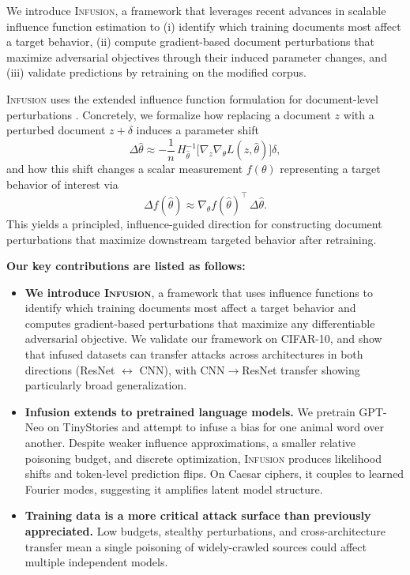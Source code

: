 \documentclass{article}
\theoremstyle{plain}
\theoremstyle{definition}
\theoremstyle{remark}
\begin{document}
We introduce \textsc{Infusion}, a framework that leverages recent advances in scalable influence function estimation \citep{bae2022if, grosse2023studying} to (i) identify which training documents most affect a target behavior, (ii) compute gradient-based document perturbations that maximize adversarial objectives through their induced parameter changes, and (iii) validate predictions by retraining on the modified corpus.


\textsc{Infusion} uses the extended influence function formulation for document-level perturbations \citep{koh2017understanding}. Concretely, we formalize how replacing a document $z$ with a perturbed document $z+\delta$ induces a parameter shift
\begin{equation}
\Delta \hat{\theta}
\approx
-\frac{1}{n}\, H_{\hat{\theta}}^{-1}
\Big[\nabla_{z}\nabla_{\theta} L\!\left(z,\hat{\theta}\right)\Big]\delta,
\end{equation}
and how this shift changes a scalar measurement $f(\theta)$ representing a target behavior of interest via
\begin{equation}
\Delta f(\hat{\theta})
\approx
\nabla_{\theta} f(\hat{\theta})^{\top}\,\Delta \hat{\theta}.
\end{equation}
This yields a principled, influence-guided direction for constructing document perturbations that maximize downstream targeted behavior after retraining.


\textbf{Our key contributions are listed as follows:}

\begin{itemize}
    \item \textbf{We introduce \textsc{Infusion}}, a framework that uses influence functions to identify which training documents most affect a target behavior and computes gradient-based perturbations that maximize any differentiable adversarial objective. We validate our framework on CIFAR-10, and show that infused datasets can transfer attacks across architectures in both directions (ResNet $\leftrightarrow$ CNN), with CNN$\to$ResNet transfer showing particularly broad generalization.
    \item \textbf{Infusion extends to pretrained language models.} We pretrain GPT-Neo on TinyStories and attempt to infuse a bias for one animal word over another. Despite weaker influence approximations, a smaller relative poisoning budget, and discrete optimization, \textsc{Infusion} produces likelihood shifts and token-level prediction flips. On Caesar ciphers, it couples to learned Fourier modes, suggesting it amplifies latent model structure.
    \item \textbf{Training data is a more critical attack surface than previously appreciated.} Low budgets, stealthy perturbations, and cross-architecture transfer mean a single poisoning of widely-crawled sources could affect multiple independent models.
\end{itemize}
\end{document}
